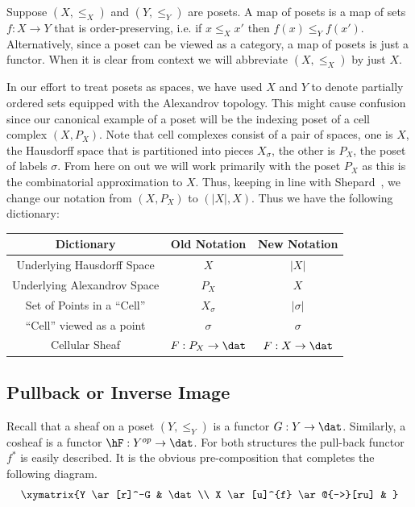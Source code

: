 \begin{defn}
	Suppose $(X,\leq_X)$ and $(Y,\leq_Y)$ are posets. A map of posets is a map of sets $f:X\to Y$ that is order-preserving, i.e. if $x\leq_X x'$ then $f(x)\leq_Y f(x')$. Alternatively, since a poset can be viewed as a category, a map of posets is just a functor. When it is clear from context we will abbreviate $(X, \leq_X)$ by just $X$.
\end{defn}

\begin{rmk}\label{rmk:cell_notation}
	In our effort to treat posets as spaces, we have used $X$ and $Y$ to denote partially ordered sets equipped with the Alexandrov topology. This might cause confusion since our canonical example of a poset will be the indexing poset of a cell complex $(X,P_X)$. Note that cell complexes consist of a pair of spaces, one is $X$, the Hausdorff space that is partitioned into pieces $X_{\sigma}$, the other is $P_X$, the poset of labels $\sigma$. From here on out we will work primarily with the poset $P_X$ as this is the combinatorial approximation to $X$. 
Thus, keeping in line with Shepard~\cite{shepard}, we change our notation from $(X,P_X)$ to $(|X|,X)$. Thus we have the following dictionary:
\begin{center}
\begin{tabular}{c |  c  c}
	 Dictionary & Old Notation & New Notation \\
	\hline
	Underlying Hausdorff Space & $X$ & $|X|$ \\
	Underlying Alexandrov Space & $P_X$ & $X$ \\
	Set of Points in a ``Cell'' & $X_{\sigma}$ & $|\sigma|$ \\
	``Cell'' viewed as a point & $\sigma$ & $\sigma$ \\
	Cellular Sheaf & $F:P_X\to\dat$ & $F:X\to\dat$
\end{tabular}
\end{center}
\end{rmk}

\subsection{Pullback or Inverse Image}
\label{subsubsec:pullback}

Recall that a sheaf on a poset $(Y,\leq_Y)$ is a functor $G:Y\to\dat$.  Similarly, a cosheaf is a functor $\hF:Y^{op}\to\dat$. For both structures the pull-back functor $f^*$ is easily described. It is the obvious pre-composition that completes the following diagram.
\[
\xymatrix{Y \ar[r]^-G & \dat \\
X \ar[u]^{f} \ar@{-->}[ru] & }
\]

